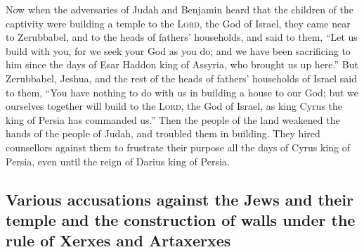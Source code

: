  Now when the adversaries of Judah and Benjamin heard that
the children of the captivity were building a temple to the
\textsc{Lord}, the God of Israel,  they came near to
Zerubbabel, and to the heads of fathers' households, and said to them,
``Let us build with you, for we seek your God as you do; and we have
been sacrificing to him since the days of Esar Haddon king of Assyria,
who brought us up here.''  But Zerubbabel, Jeshua, and the
rest of the heads of fathers' households of Israel said to them, ``You
have nothing to do with us in building a house to our God; but we
ourselves together will build to the \textsc{Lord}, the God of Israel,
as king Cyrus the king of Persia has commanded us.''  Then
the people of the land weakened the hands of the people of Judah, and
troubled them in building.  They hired counsellors against
them to frustrate their purpose all the days of Cyrus king of Persia,
even until the reign of Darius king of Persia.

\hypertarget{various-accusations-against-the-jews-and-their-temple-and-the-construction-of-walls-under-the-rule-of-xerxes-and-artaxerxes}{%
\subsection{Various accusations against the Jews and their temple and
the construction of walls under the rule of Xerxes and
Artaxerxes}\label{various-accusations-against-the-jews-and-their-temple-and-the-construction-of-walls-under-the-rule-of-xerxes-and-artaxerxes}}

